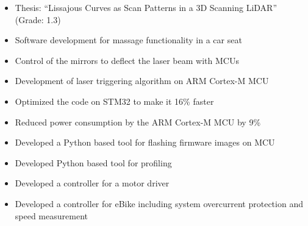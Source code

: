 {    
        {}
        {}
        {}
        {}
        {
        \techStackBlickfeld
        \begin{itemize}
            \item Thesis: “Lissajous Curves as Scan Patterns in a 3D Scanning LiDAR” (Grade: 1.3)
            \item Software development for massage functionality in a car seat
            \item Control of the mirrors to deflect the laser beam with MCUs
            \item Development of laser triggering algorithm on ARM Cortex-M MCU
            \item Optimized the code on STM32 to make it 16\% faster
            \item Reduced power consumption by the ARM Cortex-M MCU by 9\%
            \item Developed a Python based tool for flashing firmware images on MCU
            \item Developed Python based tool for profiling
        \end{itemize}
        }

        \vspace*{10pt}

        {}
        {}
        {}
        {}
        {
        \techStackCDPL
        \begin{itemize}
            \item Developed a controller for a motor driver
            \item Developed a controller for eBike including system overcurrent protection and speed measurement
        \end{itemize}
        }
}{}